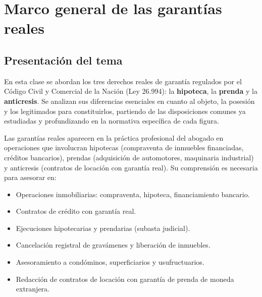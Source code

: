 \documentclass[12pt,oneside]{book}
\begin{document}
\tableofcontents


\chapter[Marco general de las garantías reales]{Marco general de las garantías reales}

\section{Presentación del tema}

En esta clase se abordan los tres derechos reales de garantía regulados por el Código Civil y Comercial de la Nación (Ley 26.994): la \textbf{hipoteca}, la \textbf{prenda} y la \textbf{anticresis}. Se analizan sus diferencias esenciales en cuanto al objeto, la posesión y los legitimados para constituirlos, partiendo de las disposiciones comunes ya estudiadas y profundizando en la normativa específica de cada figura.

Las garantías reales aparecen en la práctica profesional del abogado en operaciones que involucran hipotecas (compraventa de inmuebles financiadas, créditos bancarios), prendas (adquisición de automotores, maquinaria industrial) y anticresis (contratos de locación con garantía real). Su comprensión es necesaria para asesorar en:

\begin{itemize}
    \item Operaciones inmobiliarias: compraventa, hipoteca, financiamiento bancario.
    \item Contratos de crédito con garantía real.
    \item Ejecuciones hipotecarias y prendarias (subasta judicial).
    \item Cancelación registral de gravámenes y liberación de inmuebles.
    \item Asesoramiento a condóminos, superficiarios y usufructuarios.
    \item Redacción de contratos de locación con garantía de prenda de moneda extranjera.
\end{itemize}
\end{document}
